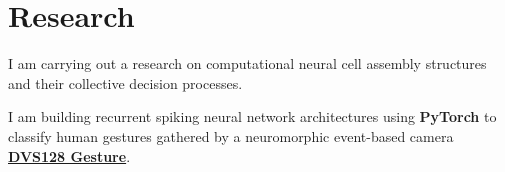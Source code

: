 \documentclass[letterpaper]{deedy-resume} %
\begin{document}
\begin{minipage}[t]{0.66\textwidth}

%

%


\section{Research}

\sectionspace %

\begin{tightitemize}
\item I am carrying out a research on computational neural cell assembly structures and their collective decision processes.
\item I am building recurrent spiking neural network architectures using \textbf{PyTorch} to classify human gestures gathered by a neuromorphic event-based camera \href{https://www.research.ibm.com/dvsgesture/#:~:text=Access%20the%20dataset%20that%20was,%2DBased%20Gesture%20Recognition%20System.%22}{\bf DVS128 Gesture}.
\end{tightitemize}


\end{minipage}
\end{document}
